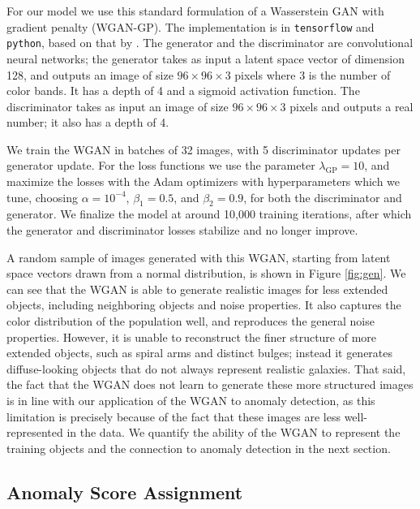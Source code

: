 For our model we use this standard formulation of a Wasserstein GAN with gradient penalty (WGAN-GP).
The implementation is in \texttt{tensorflow} and \texttt{python}, based on that by \cite{Gulrajani2017}.
The generator and the discriminator are convolutional neural networks; the generator takes as input a latent space vector of dimension 128, and outputs an image of size $96\times96\times3$ pixels where 3 is the number of color bands.
It has a depth of 4 and a sigmoid activation function.
The discriminator takes as input an image of size $96\times96\times3$ pixels and outputs a real number; it also has a depth of 4.

We train the WGAN in batches of 32 images, with 5 discriminator updates per generator update.
For the loss functions we use the parameter $\lambda_\text{GP}=10$, and maximize the losses with the Adam optimizers with hyperparameters which we tune, choosing $\alpha=10^{-4}$, $\beta_1=0.5$, and $\beta_2=0.9$, for both the discriminator and generator.
We finalize the model at around 10,000 training iterations, after which the generator and discriminator losses stabilize and no longer improve.

A random sample of images generated with this WGAN, starting from latent space vectors drawn from a normal distribution, is shown in Figure \ref{fig:gen}.
We can see that the WGAN is able to generate realistic images for less extended objects, including neighboring objects and noise properties.
It also captures the color distribution of the population well, and reproduces the general noise properties.
However, it is unable to reconstruct the finer structure of more extended objects, such as spiral arms and distinct bulges; instead it generates diffuse-looking objects that do not always represent realistic galaxies.
That said, the fact that the WGAN does not learn to generate these more structured images is in line with our application of the WGAN to anomaly detection, as this limitation is precisely because of the fact that these images are less well-represented in the data.
We quantify the ability of the WGAN to represent the training objects and the connection to anomaly detection in the next section.

\subsection{Anomaly Score Assignment}
\label{sec:sanom_assignment}

